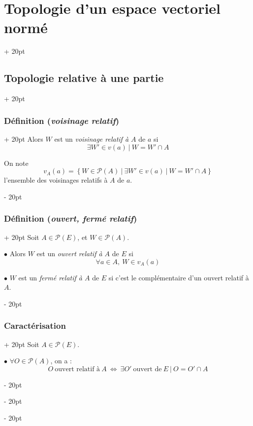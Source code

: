 \documentclass[a4paper, 12pt, twoside]{article}
\newcommand{\set}[1]{\left\{ #1 \right\}}
\newcommand{\ssi}{\ \Leftrightarrow \ }
\newcommand{\ind}[1][20pt]{\advance\leftskip + #1}
\newcommand{\deind}[1][20pt]{\advance\leftskip - #1}
\newenvironment{indt}[2][20pt]{#2 \par \ind[#1]}{\par \deind} %
\begin{document}
\begin{indt}{\section{Topologie d'un espace vectoriel normé}}
\begin{indt}{\subsection{Topologie relative à une partie}}
\begin{indt}{\subsubsection{Définition (\textit{voisinage relatif})}}
                Alors $W$ est un \emph{voisinage relatif à $A$} de $a$ si
                \[
                    \exists W' \in v(a)\ |\ W = W' \cap A
                \]

                On note
                \[
                    v_A(a) = \set{W \in \mathcal P(A)\ |\ \exists W' \in v(a)\ |\ W = W' \cap A}
                \]
                l'ensemble des voisinages relatifs à $A$ de $a$.
            \end{indt}

            \vspace{12pt}
            
            \begin{indt}{\subsubsection{Définition (\textit{ouvert, fermé relatif})}}
                Soit $A \in \mathcal P(E)$, et $W \in \mathcal P(A)$.

                \vspace{6pt}
                
                $\bullet$ Alors $W$ est un \emph{ouvert relatif à $A$} de $E$ si
                \[
                    \forall a \in A,\ W \in v_A(a)
                \]

                \vspace{6pt}
                
                $\bullet$ $W$ est un \emph{fermé relatif à $A$} de $E$ si c'est le complémentaire d'un ouvert relatif à $A$.
            \end{indt}

            \vspace{12pt}
            
            \begin{indt}{\subsubsection{Caractérisation}}
                Soit $A \in \mathcal P(E)$.

                \vspace{6pt}
                
                $\bullet$ $\forall O \in \mathcal P(A)$, on a :
                \[
                    O\ \text{ouvert relatif à}\ A
                    \ssi
                    \exists O'\ \text{ouvert de}\ E\ |\ O = O' \cap A
                \]


\end{indt}
\end{indt}
\end{indt}
\end{document}
